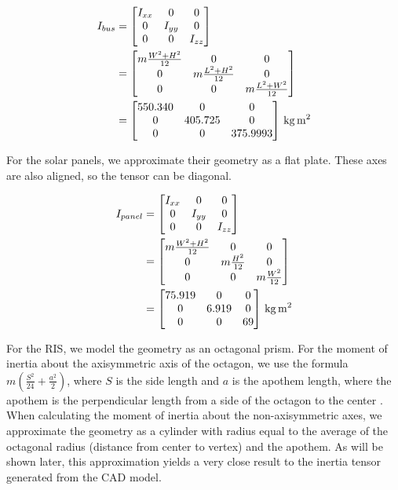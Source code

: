 \begin{align*}
I_{bus} &=
\begin{bmatrix}
I_{xx} & 0 & 0 \\
0 & I_{yy} & 0 \\
0 & 0 & I_{zz}
\end{bmatrix} \\
&=
\begin{bmatrix}
m \frac{W^{2} + H^{2}}{12} & 0 & 0 \\
0 & m \frac{L^{2} + H^{2}}{12} & 0 \\
0 & 0 & m \frac{L^{2} + W^{2}}{12} 
\end{bmatrix} \\
&=
\qty[parse-numbers = false]{
\begin{bmatrix}
550.340 & 0 & 0 \\
0 & 405.725 & 0 \\
0 & 0 & 375.9993 
\end{bmatrix}
}{\kilogram\metre\squared}
\end{align*}

For the solar panels, we approximate their geometry as a flat plate. These axes are also aligned, so the tensor can be diagonal.

\begin{align*}
I_{panel} &=
\begin{bmatrix}
I_{xx} & 0 & 0 \\
0 & I_{yy} & 0 \\
0 & 0 & I_{zz}
\end{bmatrix} \\
&=
\begin{bmatrix}
m \frac{W^{2} + H^{2}}{12} & 0 & 0 \\
0 & m \frac{H^{2}}{12} & 0 \\
0 & 0 & m \frac{W^{2}}{12} 
\end{bmatrix} \\
&=
\qty[parse-numbers = false]{
\begin{bmatrix}
75.919 & 0 & 0 \\
0 & 6.919 & 0 \\
0 & 0 & 69 
\end{bmatrix}
}{\kilogram\metre\squared}
\end{align*}

For the RIS, we model the geometry as an octagonal prism. For the moment of inertia about the axisymmetric axis of the octagon, we use the formula $m \left(\frac{S^{2}}{24} + \frac{a^{2}}{2}\right)$, where $S$ is the side length and $a$ is the apothem length, where the apothem is the perpendicular length from a side of the octagon to the center \cite{McCarron}. When calculating the moment of inertia about the non-axisymmetric axes, we approximate the geometry as a cylinder with radius equal to the average of the octagonal radius (distance from center to vertex) and the apothem. As will be shown later, this approximation yields a very close result to the inertia tensor generated from the CAD model.

